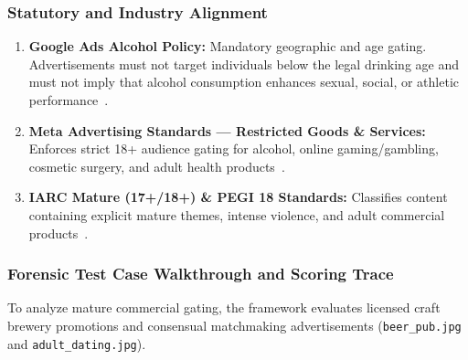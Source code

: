 \documentclass[12pt,a4paper]{report}
\begin{document}
\subsubsection{Statutory and Industry Alignment}
\begin{enumerate}
    \item \textbf{Google Ads Alcohol Policy:} Mandatory geographic and age gating. Advertisements must not target individuals below the legal drinking age and must not imply that alcohol consumption enhances sexual, social, or athletic performance~\cite{googlealcohol}.
    \item \textbf{Meta Advertising Standards --- Restricted Goods \& Services:} Enforces strict 18+ audience gating for alcohol, online gaming/gambling, cosmetic surgery, and adult health products~\cite{metaads}.
    \item \textbf{IARC Mature (17+/18+) \& PEGI 18 Standards:} Classifies content containing explicit mature themes, intense violence, and adult commercial products~\cite{iarcratings}.
\end{enumerate}

\subsubsection{Forensic Test Case Walkthrough and Scoring Trace}
To analyze mature commercial gating, the framework evaluates licensed craft brewery promotions and consensual matchmaking advertisements (\texttt{beer\_pub.jpg} and \texttt{adult\_dating.jpg}).
\end{document}

